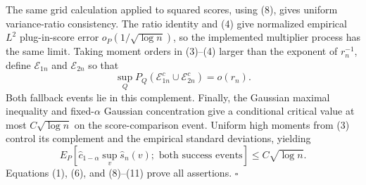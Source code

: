 The same grid calculation applied to squared scores, using (8), gives uniform variance-ratio consistency. The ratio identity and (4) give normalized empirical \(L^2\) plug-in-score error \(o_P(1/\sqrt{\log n})\), so the implemented multiplier process has the same limit. Taking moment orders in (3)--(4) larger than the exponent of \(r_n^{-1}\), define \(\mathcal E_{1n}\) and \(\mathcal E_{2n}\) so that
\[
 \sup_QP_Q(\mathcal E_{1n}^c\cup\mathcal E_{2n}^c)=o(r_n). \tag{10}
\]
Both fallback events lie in this complement. Finally, the Gaussian maximal inequality and fixed-\(\alpha\) Gaussian concentration give a conditional critical value at most \(C\sqrt{\log n}\) on the score-comparison event. Uniform high moments from (3) control its complement and the empirical standard deviations, yielding
\[
 E_P[\widehat c_{1-\alpha}\sup_v\widehat s_n(v);\text{ both success events}]
 \le C\sqrt{\log n}. \tag{11}
\]
Equations (1), (6), and (8)--(11) prove all assertions. \(\square\)